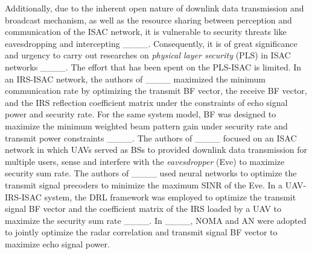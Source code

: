 Additionally, due to the inherent open nature of downlink data transmission and broadcast mechanism, as well as the resource sharing between perception and communication of the ISAC network, it is vulnerable to security threats like eavesdropping and intercepting ____. Consequently, it is of great significance and urgency to carry out researches on \emph{physical layer security} (PLS) in ISAC networks ____. The effort that has been spent on the PLS-ISAC is limited. In an IRS-ISAC network, the authors of ____ maximized the minimum communication rate by optimizing the transmit BF vector, the receive BF vector, and the IRS reflection coefficient matrix under the constraints of echo signal power and security rate. For the same system model, BF was designed to maximize the minimum weighted beam pattern gain under security rate and transmit power constraints ____. 
The authors of ____ focused on an ISAC network in which UAVs served as BSs to provided downlink data transmission for multiple users, sense and interfere with the \emph{eavesdropper} (Eve) to maximize security sum rate. 
The authors of ____ used neural networks to optimize the transmit signal precoders to minimize the maximum SINR of the Eve. In a UAV-IRS-ISAC system, the DRL framework was employed to optimize the transmit signal BF vector and the coefficient matrix of the IRS loaded by a UAV to maximize the security sum rate ____. In ____, NOMA and AN were adopted to jointly optimize the radar correlation and transmit signal BF vector to maximize echo signal power. %

%